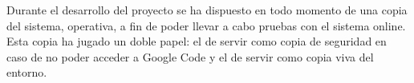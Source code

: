 Durante el desarrollo del proyecto se ha dispuesto en todo momento de una copia del sistema, operativa, a fin de poder llevar a cabo pruebas con el sistema online. Esta copia ha jugado un doble papel: el de servir como copia de seguridad en caso de no poder acceder a Google Code y el de servir como copia viva del entorno.